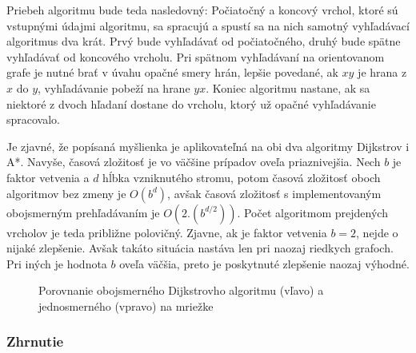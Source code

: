 Priebeh algoritmu bude teda nasledovný: Počiatočný a koncový vrchol, ktoré sú vstupnými údajmi algoritmu, sa spracujú a spustí sa na nich samotný vyhľadávací algoritmus dva krát. Prvý bude vyhľadávať od počiatočného, druhý bude spätne vyhľadávať od koncového vrcholu. Pri spätnom vyhľadávaní na orientovanom grafe je nutné brať v úvahu opačné smery hrán, lepšie povedané, ak $xy$ je hrana z $x$ do $y$, vyhľadávanie pobeží na hrane $yx$. Koniec algoritmu nastane, ak sa niektoré z dvoch hľadaní dostane do vrcholu, ktorý už opačné vyhľadávanie spracovalo.\newline

Je zjavné, že popísaná myšlienka je aplikovateľná na obi dva algoritmy \textendash Dijkstrov i A*. Navyše, časová zložitosť je vo väčšine prípadov oveľa priaznivejšia. Nech $b$ je faktor vetvenia a $d$ hĺbka vzniknutého stromu, potom časová zložitosť oboch algoritmov bez zmeny je $O(b^{d})$, avšak časová zložitosť s implementovaným obojsmerným prehľadávaním je $O(2.(b^{d/2}))$. Počet algoritmom prejdených vrcholov je teda približne polovičný. Zjavne, ak je faktor vetvenia $b = 2$, nejde o nijaké zlepšenie. Avšak takáto situácia nastáva len pri naozaj riedkych grafoch. Pri iných je hodnota $b$ oveľa väčšia, preto je poskytnuté zlepšenie naozaj výhodné.\newline

\begin{figure}[H]
  \caption{Porovnanie obojsmerného Dijkstrovho algoritmu (vľavo) a jednosmerného (vpravo) na mriežke}
  \label{Bidiretional_Dijkstra}
\end{figure}


\subsubsection{Zhrnutie}

